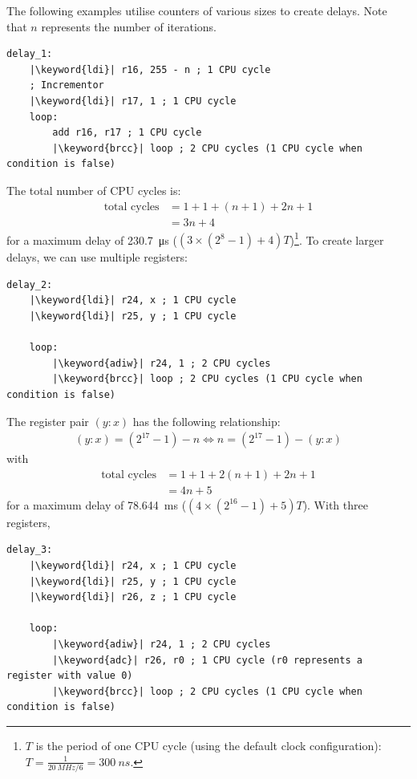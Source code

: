 \documentclass{report}
\newcommand{\keyword}[1]{\textcolor[rgb]{0.00,0.50,0.00}{\textbf{#1}}}
\begin{document}
The following examples utilise counters of various sizes to create delays.
Note that \(n\) represents the number of iterations.
\begin{verbatim}
delay_1:
    |\keyword{ldi}| r16, 255 - n ; 1 CPU cycle
    ; Incrementor
    |\keyword{ldi}| r17, 1 ; 1 CPU cycle
    loop:
        add r16, r17 ; 1 CPU cycle
        |\keyword{brcc}| loop ; 2 CPU cycles (1 CPU cycle when condition is false)
\end{verbatim}
The total number of CPU cycles is:
\begin{align*}
    \text{total cycles} & = 1 + 1 + \left( n + 1 \right) + 2 n + 1 \\
                        & = 3 n + 4
\end{align*}
for a maximum delay of \qty{230.7}{\micro s} (\(\left( 3 \times \left( 2^8 - 1 \right) + 4 \right) T\))\footnote{\(T\) is the period of one CPU cycle (using the default clock configuration): \(T = \frac{1}{\qty{20}{MHz} / 6} = \qty{300}{ns}\).}.
To create larger delays, we can use multiple registers:
\begin{verbatim}
delay_2:
    |\keyword{ldi}| r24, x ; 1 CPU cycle
    |\keyword{ldi}| r25, y ; 1 CPU cycle

    loop:
        |\keyword{adiw}| r24, 1 ; 2 CPU cycles
        |\keyword{brcc}| loop ; 2 CPU cycles (1 CPU cycle when condition is false)
\end{verbatim}
The register pair \(\left( y:x \right)\) has the following relationship:
\begin{align*}
    \left( y:x \right) = \left( 2^{17} - 1 \right) - n \iff n = \left( 2^{17} - 1 \right) - \left( y:x \right)
\end{align*}
with
\begin{align*}
    \text{total cycles} & = 1 + 1 + 2 \left( n + 1 \right) + 2 n + 1 \\
                        & = 4n + 5
\end{align*}
for a maximum delay of \qty{78.644}{ms} (\(\left(4 \times \left( 2^{16} - 1 \right) + 5 \right) T\)).
With three registers,
\begin{verbatim}
delay_3:
    |\keyword{ldi}| r24, x ; 1 CPU cycle
    |\keyword{ldi}| r25, y ; 1 CPU cycle
    |\keyword{ldi}| r26, z ; 1 CPU cycle

    loop:
        |\keyword{adiw}| r24, 1 ; 2 CPU cycles
        |\keyword{adc}| r26, r0 ; 1 CPU cycle (r0 represents a register with value 0)
        |\keyword{brcc}| loop ; 2 CPU cycles (1 CPU cycle when condition is false)
\end{verbatim}
\end{document}
